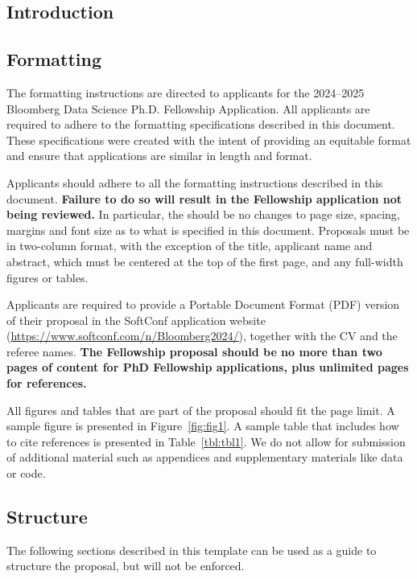\documentclass[10pt]{article}
\begin{document}
\begin{multicols*}{2}

\section{Introduction}

\subsection{Formatting}

The formatting instructions are directed to applicants for the 2024--2025 Bloomberg Data Science Ph.D. Fellowship Application. All applicants are required to adhere to the formatting specifications described in this document. These specifications were created with the intent of providing an equitable format and ensure that applications are similar in length and format.

Applicants should adhere to all the formatting instructions described in this document. \textbf{Failure to do so will result in the Fellowship application not being reviewed.} In particular, the should be no changes to page size, spacing, margins and font size as to what is specified in this document.
Proposals must be in two-column format, with the exception of the title, applicant name and abstract, which must be centered at the top of the first page, and any full-width figures or tables.

Applicants are required to provide a Portable Document Format (PDF) version of their proposal in the SoftConf application website (\url{https://www.softconf.com/n/Bloomberg2024/}), together with the CV and the referee names. \textbf{The Fellowship proposal should be no more than two pages of content for PhD Fellowship applications, plus unlimited pages for references.}

All figures and tables that are part of the proposal should fit the page limit. A sample figure is presented in Figure~\ref{fig:fig1}. A sample table that includes how to cite references is presented in Table~\ref{tbl:tbl1}. We do not allow for submission of additional material such as appendices and supplementary materials like data or code.

\subsection{Structure}

The following sections described in this template can be used as a guide to structure the proposal, but will not be enforced.


\end{multicols*}
\end{document}
